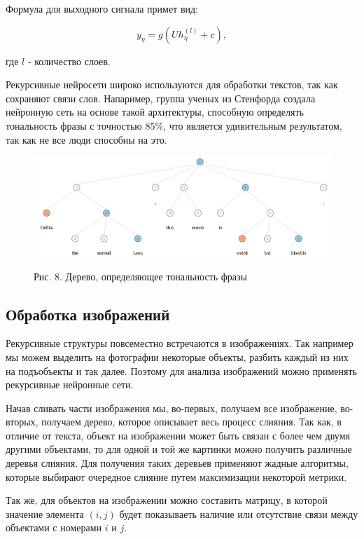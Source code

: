 \documentclass[14pt]{article}
\begin{document}
Формула для выходного сигнала примет вид:

\begin{equation}
y_\eta=g(Uh_\eta^{(l)} + c),
\end{equation}


где $l$ - количество слоев.


Рекурсивные нейросети широко используются для обработки текстов, так как сохраняют связи слов. Напаример, группа ученых из Стенфорда создала нейронную сеть на основе такой архитектуры, способную определять тональность фразы с точностью $85\%$, что является удивительным результатом, так как не все люди способны на это.

\begin{figure}[!h]
    \centering
        \includegraphics[width=16cm]{Fig8.png}
    \parbox[t][1.2cm][c]{16cm}{
        \centering
        Рис. 8. Дерево, определяющее тональность фразы
    }
\end{figure}

\subsection{Обработка изображений}
Рекурсивные структуры повсеместно встречаются в изображениях. Так например мы можем выделить на фотографии некоторые объекты, разбить каждый из них на подъобъекты и так далее. Поэтому для анализа изображений можно применять рекурсивные нейронные сети.

Начав сливать части изображения мы, во-первых, получаем все изображение, во-вторых, получаем дерево, которое описывает весь процесс слияния. Так как, в отличие от текста, объект на изображении может быть связан с более чем двумя другими объектами, то для одной и той же картинки можно получить различные деревья слияния. Для получения таких деревьев применяют жадные алгоритмы, которые выбирают очередное слияние путем максимизации некоторой метрики.


Так же, для объектов на изображении можно составить матрицу, в которой значение элемента $(i, j)$ будет показываеть наличие или отсутствие связи между объектами с номерами $i$ и $j$.
\end{document}
